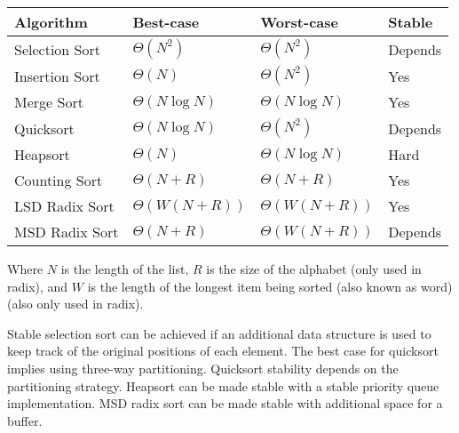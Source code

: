 \begin{solution}
{
\renewcommand{\arraystretch}{2}
\setlength{\tabcolsep}{12pt}
\begin{tabularx}{\textwidth}{Xlll}
Algorithm         & Best-case          & Worst-case          & Stable \\\hline
Selection Sort    & $\Theta(N^2)$      & $\Theta(N^2)$       & Depends\\
Insertion Sort    & $\Theta(N)$        & $\Theta(N^2)$       & Yes    \\
Merge Sort        & $\Theta(N \log N)$ & $\Theta(N \log N)$  & Yes    \\
Quicksort         & $\Theta(N \log N)$        & $\Theta(N^2)$       & Depends\\
Heapsort          & $\Theta(N)$        & $\Theta(N \log N)$  & Hard   \\
Counting Sort     & $\Theta(N + R)$    & $\Theta(N + R)$     & Yes    \\
LSD Radix Sort    & $\Theta(W(N + R))$ & $\Theta(W(N + R))$  & Yes    \\
MSD Radix Sort    & $\Theta(N + R)$    & $\Theta(W(N + R))$  & Depends\\
\end{tabularx}
}

Where $N$ is the length of the list, $R$ is the size of the alphabet (only used in radix),
and $W$ is the length of the longest item being sorted (also known as word) (also only used in radix).

Stable selection sort can be achieved if an additional data structure is used
to keep track of the original positions of each element. The best case for
quicksort implies using three-way partitioning. Quicksort stability depends on
the partitioning strategy. Heapsort can be made stable with a stable priority
queue implementation. MSD radix sort can be made stable with additional space
for a buffer.
\end{solution}
